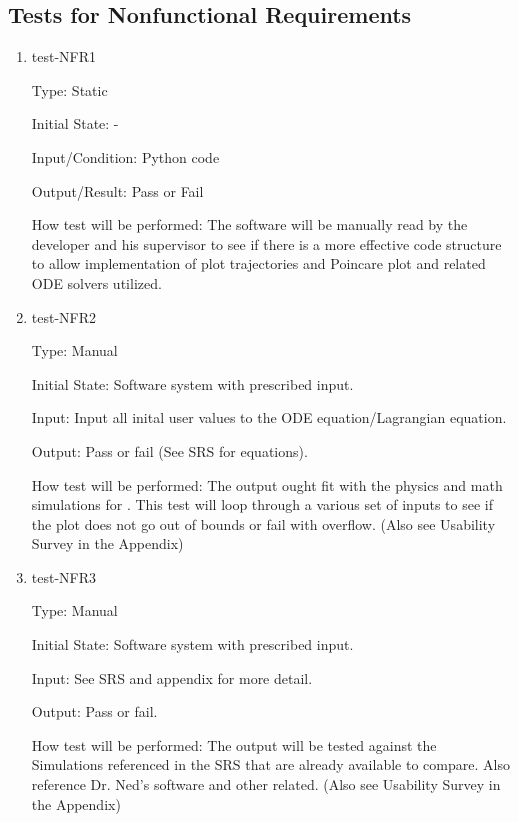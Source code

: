 \documentclass[12pt, titlepage]{article}
\begin{document}

\subsection{Tests for Nonfunctional Requirements}

\begin{enumerate}

\item{test-NFR1\\}

Type: Static
					
Initial State: -
					
Input/Condition: \progname Python code
					
Output/Result: Pass or Fail
					
How test will be performed: The software will be manually read by the developer 
and his supervisor to see if there is a more effective code structure to allow 
implementation of plot trajectories and Poincare plot and related ODE solvers
utilized.  

\item{test-NFR2\\} 

Type: Manual 

Initial State: Software system with prescribed input.

Input: Input all inital user values to the ODE equation/Lagrangian equation.

Output: Pass or fail (See SRS for equations).

How test will be performed: The output ought fit with the physics and math 
simulations for \progname. This test will loop through a various set of inputs 
to see if the plot does not go out of bounds or fail with overflow. (Also see Usability
Survey in the Appendix)

\item{test-NFR3\\} 

Type: Manual 

Initial State: Software system with prescribed input.

Input: See SRS and appendix for more detail.

Output: Pass or fail.

How test will be performed: The output will be tested against the Simulations
referenced in the SRS that are already available to compare. Also reference
Dr. Ned's software and other related. (Also see Usability
Survey in the Appendix) \\

\end{enumerate}
\end{document}
